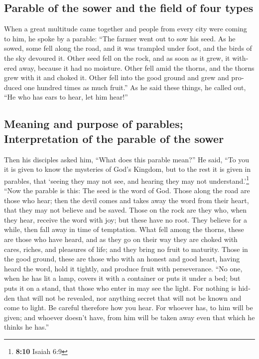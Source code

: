 \begin{paracol}{2}
\begin{otherlanguage}{english}
\hypertarget{parable-of-the-sower-and-the-field-of-four-types}{%
\subsection{Parable of the sower and the field of four
types}\label{parable-of-the-sower-and-the-field-of-four-types}}

 When a great multitude came together and people from
every city were coming to him, he spoke by a parable: 
``The farmer went out to sow his seed. As he sowed, some fell along the
road, and it was trampled under foot, and the birds of the sky devoured
it.  Other seed fell on the rock, and as soon as it grew,
it withered away, because it had no moisture.  Other fell
amid the thorns, and the thorns grew with it and choked it.
 Other fell into the good ground and grew and produced one
hundred times as much fruit.'' As he said these things, he called out,
``He who has ears to hear, let him hear!''

\hypertarget{meaning-and-purpose-of-parables-interpretation-of-the-parable-of-the-sower}{%
\subsection{Meaning and purpose of parables; Interpretation of the
parable of the
sower}\label{meaning-and-purpose-of-parables-interpretation-of-the-parable-of-the-sower}}

 Then his disciples asked him, ``What does this parable
mean?''  He said, ``To you it is given to know the
mysteries of God's Kingdom, but to the rest it is given in parables,
that `seeing they may not see, and hearing they may not
understand.'\footnote{\textbf{8:10} Isaiah 6:9}  ``Now
the parable is this: The seed is the word of God.  Those
along the road are those who hear; then the devil comes and takes away
the word from their heart, that they may not believe and be saved.
 Those on the rock are they who, when they hear, receive
the word with joy; but these have no root. They believe for a while,
then fall away in time of temptation.  What fell among
the thorns, these are those who have heard, and as they go on their way
they are choked with cares, riches, and pleasures of life; and they
bring no fruit to maturity.  Those in the good ground,
these are those who with an honest and good heart, having heard the
word, hold it tightly, and produce fruit with perseverance.
 ``No one, when he has lit a lamp, covers it with a
container or puts it under a bed; but puts it on a stand, that those who
enter in may see the light.  For nothing is hidden that
will not be revealed, nor anything secret that will not be known and
come to light.  Be careful therefore how you hear. For
whoever has, to him will be given; and whoever doesn't have, from him
will be taken away even that which he thinks he has.''


\end{otherlanguage}
\end{paracol}
